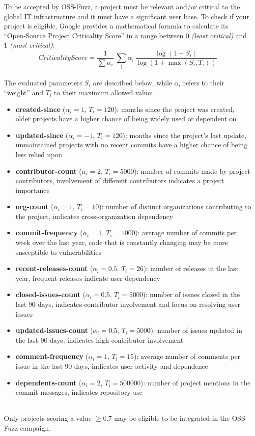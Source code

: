 \newpage
To be accepted by OSS-Fuzz, a project must be relevant and/or critical to the global IT infrastructure and it must have a significant user base. To check if your project is eligible, Google provides a mathematical formula to calculate its ``Open-Source Project Criticality Score'' \cite{score} in a range between 0 \textit{(least critical)} and 1 \textit{(most critical)}:
\newline
\begin{equation}
    CriticalityScore = \frac{1}{\sum \alpha_i}\  \sum_i \alpha_i \ \frac{\log(1+S_i)}{\log(1+\max(S_i,T_i))}
\end{equation}
\ \\
The evaluated parameters $S_i$ are described below, while $\alpha_i$ refers to their ``weight'' and $T_i$ to their maximum allowed value:
\begin{itemize}
    \item \textbf{created-since} ($\alpha_i = 1$, $T_i = 120$): months since the project was created, older projects have a higher chance of being widely used or dependent on
    \item \textbf{updated-since} ($\alpha_i = -1$, $T_i = 120$): months since the project's last update, unmaintained projects with no recent commits have a higher chance of being less relied upon
    \item \textbf{contributor-count} ($\alpha_i = 2$, $T_i = 5000$): number of commits made by project contributors, involvement of different contributors indicates a project importance
    \item \textbf{org-count} ($\alpha_i = 1$, $T_i = 10$): number of distinct organizations contributing to the project, indicates cross-organization dependency
    \item \textbf{commit-frequency} ($\alpha_i = 1$, $T_i = 1000$): average number of commits per week over the last year, code that is constantly changing may be more susceptible to vulnerabilities
    \item \textbf{recent-releases-count} ($\alpha_i = 0.5$, $T_i = 26$): number of releases in the last year, frequent releases indicate user dependency
    \item \textbf{closed-issues-count} ($\alpha_i = 0.5$, $T_i = 5000$): number of issues closed in the last 90 days, indicates contributor involvement and focus on resolving user issues
    \item \textbf{updated-issues-count} ($\alpha_i = 0.5$, $T_i = 5000$): number of issues updated in the last 90 days, indicates high contributor involvement
    \item \textbf{comment-frequency} ($\alpha_i = 1$, $T_i = 15$): average number of comments per issue in the last 90 days, indicates user activity and dependence
    \item \textbf{dependents-count} ($\alpha_i = 2$, $T_i = 500000$): number of project mentions in the commit messages, indicates repository use
\end{itemize}
\ \\
Only projects scoring a value $\geq 0.7$ may be eligible to be integrated in the OSS-Fuzz campaign.


